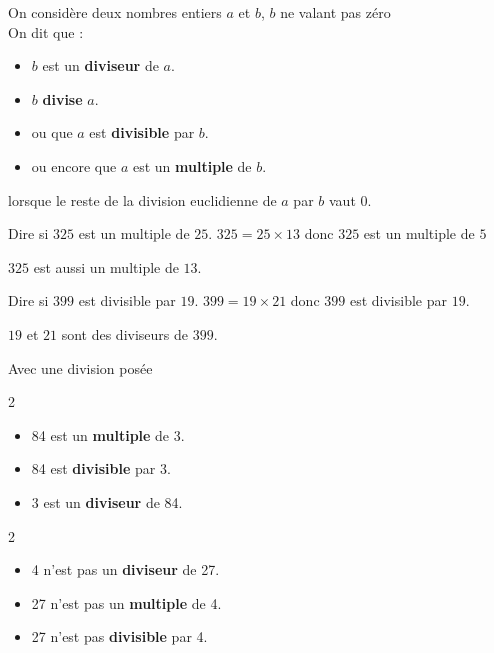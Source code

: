 \begin{definition}
On considère deux nombres entiers $a$ et $b$, $b$ ne valant pas zéro\\
On dit que :
\begin{itemize}
\item $b$ est un \textbf{diviseur} de $a$.
\item $b$ \textbf{divise} $a$.
\item ou que $a$ est \textbf{divisible} par $b$.
\item ou encore que $a$ est un \textbf{multiple} de $b$.
\end{itemize}
lorsque le reste de la division euclidienne de $a$ par $b$ vaut $0$.
\end{definition}

\begin{exemple}
Dire si $325$ est un multiple de $25$.
\correction 
$325=25\times13$ donc $325$ est un multiple de $5$
\end{exemple}
\begin{remarque}
	$325$ est aussi un multiple de $13$.
\end{remarque}

\begin{exemple}
	Dire si $399$ est divisible par $19$.
	\correction 
	$399=19\times21$ donc $399$ est divisible par $19$.
\end{exemple}
\begin{remarque}
	$19$ et $21$ sont des diviseurs de $399$.
\end{remarque}

\begin{exemple*1}
	Avec une division posée

	\begin{multicols}2
		\columnbreak
		\begin{itemize}
			\item 84 est un \textbf{multiple} de 3.
			\item 84 est \textbf{divisible} par 3.
			\item 3 est un \textbf{diviseur} de 84.
		\end{itemize}
	\end{multicols}

	\begin{multicols}2
		\opidiv[displayintermediary=all]{27}{4}
		\columnbreak
		\begin{itemize}
			\item 4 n'est pas un \textbf{diviseur} de 27.
			\item 27 n'est pas un \textbf{multiple} de 4.
			\item 27 n'est pas \textbf{divisible} par 4.
		\end{itemize}
	\end{multicols}	
\end{exemple*1}